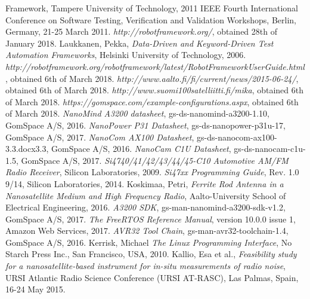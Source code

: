 \documentclass[english,12pt,a4paper,pdftex,elec,utf8]{aaltothesis}
\begin{document}
\begin{thebibliography}{99}
{Framework}, Tampere University of Technology, 2011 IEEE Fourth International Conference on Software Testing, Verification and Validation Workshops, Berlin, Germany, 21-25 March 2011.  
  \textit{http://robotframework.org/}, obtained 28th of January 2018.
 Laukkanen, Pekka,
  \textit{Data-Driven and Keyword-Driven Test Automation Frameworks}, Helsinki University of Technology, 2006.
  \textit{http://robotframework.org/robotframework/latest/RobotFrameworkUserGuide.html}, obtained 6th of March 2018.  
  \textit{http://www.aalto.fi/fi/current/news/2015-06-24/}, obtained 6th of March 2018.
  \textit{http://www.suomi100satelliitti.fi/mika}, obtained 6th of March 2018.
  \textit{https://gomspace.com/example-configurations.aspx}, obtained 6th of March 2018.
  \textit{NanoMind A3200 datasheet}, gs-ds-nanomind-a3200-1.10, GomSpace A/S, 2016.
  \textit{NanoPower P31 Datasheet}, gs-ds-nanopower-p31u-17, GomSpace A/S, 2017.
  \textit{NanoCom AX100 Datasheet}, gs-ds-nanocom-ax100-3.3.docx3.3, GomSpace A/S, 2016.
  \textit{NanoCam C1U Datasheet}, gs-ds-nanocam-c1u-1.5, GomSpace A/S, 2017.
  \textit{Si4740/41/42/43/44/45-C10 Automotive AM/FM Radio
Receiver}, Silicon Laboratories, 2009.
  \textit{Si47xx Programming Guide}, Rev. 1.0 9/14, Silicon Laboratories, 2014.
 Koskimaa, Petri,
  \textit{Ferrite Rod Antenna in a Nanosatellite Medium and High Frequency Radio}, Aalto-University School of Electrical Engineering, 2016.
  \textit{A3200 SDK}, gs-man-nanomind-a3200-sdk-v1.2, GomSpace A/S, 2017.
  \textit{The FreeRTOS Reference Manual}, version 10.0.0 issue 1, Amazon Web Services, 2017.
  \textit{AVR32 Tool Chain}, gs-man-avr32-toolchain-1.4, GomSpace A/S, 2016.
 Kerrisk, Michael
  \textit{The Linux Programming Interface}, No Starch Press Inc., San Francisco, USA, 2010.
 Kallio, Esa et al.,
  \textit{Feasibility study for a nanosatellite-based instrument for in-situ measurements of radio noise},  URSI Atlantic Radio Science Conference (URSI AT-RASC), Las Palmas, Spain, 16-24 May 2015. 

\end{thebibliography}

\clearpage
\end{document}

